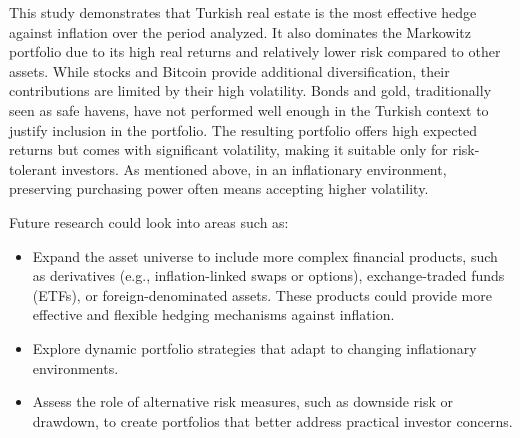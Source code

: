 \documentclass[
]{article}
\begin{document}
This study demonstrates that Turkish real estate is the most effective hedge against inflation over the period analyzed. It also dominates the Markowitz portfolio due to its high real returns and relatively lower risk compared to other assets. While stocks and Bitcoin provide additional diversification, their contributions are limited by their high volatility. Bonds and gold, traditionally seen as safe havens, have not performed well enough in the Turkish context to justify inclusion in the portfolio. The resulting portfolio offers high expected returns but comes with significant volatility, making it suitable only for risk-tolerant investors. As mentioned above, in an inflationary environment, preserving purchasing power often means accepting higher volatility.

Future research could look into areas such as: 
\begin{itemize}
  \item Expand the asset universe to include more complex financial products, such as derivatives (e.g., inflation-linked swaps or options), exchange-traded funds (ETFs), or foreign-denominated assets. These products could provide more effective and flexible hedging mechanisms against inflation.
  \item Explore dynamic portfolio strategies that adapt to changing inflationary environments.
  \item Assess the role of alternative risk measures, such as downside risk or drawdown, to create portfolios that better address practical investor concerns.
\end{itemize}

\pagebreak



\end{document}
